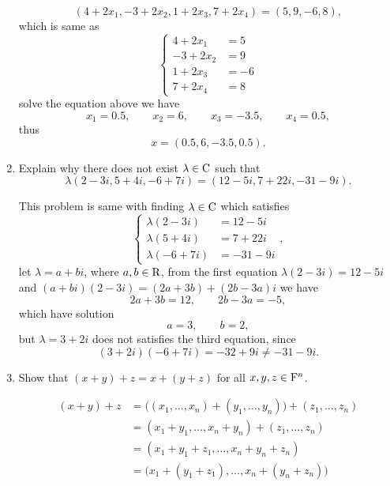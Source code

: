 \begin{enumerate}
\begin{solution}
            \[ (4+2x_1, -3+2x_2, 1+2x_3, 7+2x_4) = (5,9,-6,8),\]
            which is same as 
            \[ 
                \begin{cases}
                    4 + 2x_1 &= 5\\
                    -3 + 2x_2 &= 9 \\
                    1 + 2x_3 &= -6 \\
                    7 + 2x_4 &= 8 
                \end{cases}
            \]
            solve the equation above we have 
            \[ x_1 =0.5, \qquad x_2 = 6, \qquad x_3=-3.5, \qquad x_4=0.5 ,\]
            thus 
            \[ x = (0.5, 6, -3.5, 0.5) .\]
        \end{solution}
    \item Explain why there does not exist $\lambda \in \mathrm{C}$ such that 
        \[\lambda(2-3i,5+4i, -6+7i) = (12-5i, 7+22i, -31-9i).\]
        \begin{solution}
            This problem is same with finding $\lambda \in \mathrm{C}$ which satisfies
            \[
                \begin{cases}
                    \lambda (2-3i) &= 12-5i \\
                    \lambda (5+4i) &= 7+22i \\
                    \lambda (-6+7i) &= -31-9i
                \end{cases},
            \]
            let $\lambda = a + bi$, where $a,b\in \mathrm{R}$, from the first equation $\lambda(2-3i)=12-5i$ and $(a+bi)(2-3i) = (2a+3b) + (2b-3a)i$ we have 
            \[ 2a + 3b = 12, \qquad 2b-3a = -5,\]
            which have solution
            \[ a = 3, \qquad b = 2,\]
            but $\lambda =3 +  2i $ does not satisfies the third equation, since 
            \[ (3 + 2i) (-6+7i) = -32 + 9i \neq -31-9i.\]
        \end{solution}
    \item Show that $(x+y)+z = x+(y+z)$ for all $x, y, z \in \mathrm{F}^n$.
        \begin{solution}
            \begin{align*}
                (x+y) + z &= \big((x_1, \ldots, x_n) + (y_1,\ldots, y_n)\big) + (z_1, \ldots, z_n) \\
                          &= (x_1+y_1, \ldots, x_n+y_n) + (z_1, \ldots, z_n) \\
                          &= (x_1+y_1+z_1, \ldots, x_n+y_n+z_n) \\
                          &= \big(x_1+(y_1+z_1), \ldots, x_n + (y_n+z_n)\big) \\

\end{align*}
\end{solution}
\end{enumerate}

